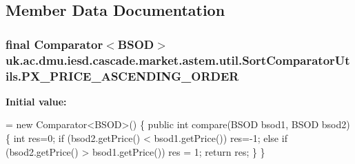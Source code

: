 \subsection{Member Data Documentation}
\hypertarget{classuk_1_1ac_1_1dmu_1_1iesd_1_1cascade_1_1market_1_1astem_1_1util_1_1_sort_comparator_utils_aaa1f36758a1fe89d004b031a0aafab26}{
\subsubsection[{P\-X\-\_\-\-P\-R\-I\-C\-E\-\_\-\-A\-S\-C\-E\-N\-D\-I\-N\-G\-\_\-\-O\-R\-D\-E\-R}]{\setlength{\rightskip}{0pt plus 5cm}final Comparator$<${\bf B\-S\-O\-D}$>$ uk.\-ac.\-dmu.\-iesd.\-cascade.\-market.\-astem.\-util.\-Sort\-Comparator\-Utils.\-P\-X\-\_\-\-P\-R\-I\-C\-E\-\_\-\-A\-S\-C\-E\-N\-D\-I\-N\-G\-\_\-\-O\-R\-D\-E\-R\hspace{0.3cm}{\ttfamily [static]}}}\label{classuk_1_1ac_1_1dmu_1_1iesd_1_1cascade_1_1market_1_1astem_1_1util_1_1_sort_comparator_utils_aaa1f36758a1fe89d004b031a0aafab26}
{\bfseries Initial value\-:}
\begin{DoxyCode}
=    \textcolor{keyword}{new} Comparator<BSOD>() \{
        \textcolor{keyword}{public} \textcolor{keywordtype}{int} compare(BSOD bsod1, BSOD bsod2) \{
            \textcolor{keywordtype}{int} res=0;
            \textcolor{keywordflow}{if} (bsod2.getPrice() < bsod1.getPrice())
                res=-1;
            \textcolor{keywordflow}{else} \textcolor{keywordflow}{if} (bsod2.getPrice() > bsod1.getPrice())
                res = 1;
            \textcolor{keywordflow}{return} res;
        \}
    \}
\end{DoxyCode}
